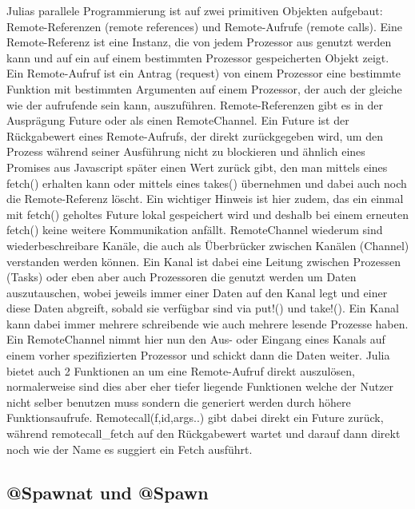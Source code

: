 \documentclass[proseminar,german,utf8]{zihpub}
\begin{document}
Julias parallele Programmierung ist auf zwei primitiven Objekten aufgebaut: Remote-Referenzen (remote references) und Remote-Aufrufe (remote calls). Eine Remote-Referenz ist eine Instanz, die von jedem Prozessor aus genutzt werden kann und auf ein auf einem bestimmten Prozessor gespeicherten Objekt zeigt. Ein Remote-Aufruf ist ein Antrag (request) von einem Prozessor eine bestimmte Funktion mit bestimmten Argumenten auf einem Prozessor, der auch der gleiche wie der aufrufende sein kann, auszuführen. Remote-Referenzen gibt es in der Ausprägung Future oder als einen RemoteChannel. Ein Future ist der Rückgabewert eines Remote-Aufrufs, der direkt zurückgegeben wird, um den Prozess während seiner Ausführung nicht zu blockieren und ähnlich eines Promises aus Javascript später einen Wert zurück gibt, den man mittels eines fetch() erhalten kann oder mittels eines takes() übernehmen und dabei auch noch die Remote-Referenz löscht. Ein wichtiger Hinweis ist hier zudem, das ein einmal mit fetch() geholtes Future lokal gespeichert wird und deshalb bei einem erneuten fetch() keine weitere Kommunikation anfällt. RemoteChannel wiederum sind wiederbeschreibare Kanäle, die auch als Überbrücker zwischen Kanälen (Channel) verstanden werden können. Ein Kanal ist dabei eine Leitung zwischen Prozessen (Tasks) oder eben aber auch Prozessoren die genutzt werden um Daten auszutauschen, wobei jeweils immer einer Daten auf den Kanal legt und einer diese Daten abgreift, sobald sie verfügbar sind via put!() und take!(). Ein Kanal kann dabei immer mehrere schreibende wie auch mehrere lesende Prozesse haben. Ein RemoteChannel nimmt hier nun den Aus- oder Eingang eines Kanals auf einem vorher spezifizierten Prozessor und schickt dann die Daten weiter. Julia bietet auch 2 Funktionen an um eine Remote-Aufruf direkt auszulösen, normalerweise sind dies aber eher tiefer liegende Funktionen welche der Nutzer nicht selber benutzen muss sondern die generiert werden durch höhere Funktionsaufrufe. Remotecall(f,id,args..) gibt dabei direkt ein Future zurück, während remotecall\_fetch auf den Rückgabewert wartet und darauf dann direkt noch wie der Name es suggiert ein Fetch ausführt.

\subsection{@Spawnat und @Spawn}
\end{document}
